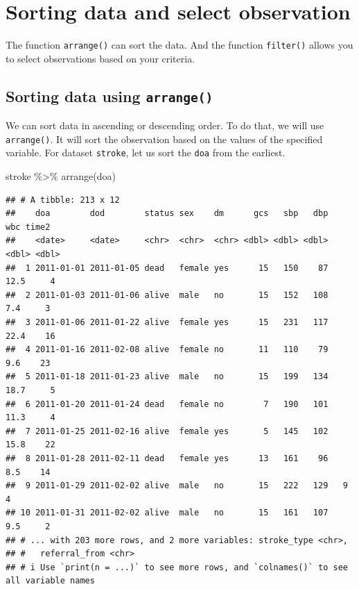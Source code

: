 \documentclass[
  10pt,
]{krantz}
\newenvironment{Shaded}{\begin{snugshade}}{\end{snugshade}}
\newcommand{\FunctionTok}[1]{\textcolor[rgb]{0.00,0.00,0.00}{#1}}
\newcommand{\NormalTok}[1]{#1}
\newcommand{\SpecialCharTok}[1]{\textcolor[rgb]{0.00,0.00,0.00}{#1}}
\begin{document}
\hypertarget{sorting-data-and-select-observation}{%
\section{Sorting data and select observation}\label{sorting-data-and-select-observation}}

The function \texttt{arrange()} can sort the data. And the function \texttt{filter()} allows you to select observations based on your criteria.

\hypertarget{sorting-data-using-arrange}{%
\subsection{\texorpdfstring{Sorting data using \texttt{arrange()}}{Sorting data using arrange()}}\label{sorting-data-using-arrange}}

We can sort data in ascending or descending order. To do that, we will use \texttt{arrange()}. It will sort the observation based on the values of the specified variable. For dataset \texttt{stroke}, let us sort the \texttt{doa} from the earliest.

\begin{Shaded}
\begin{Highlighting}[]
\NormalTok{stroke }\SpecialCharTok{\%\textgreater{}\%} \FunctionTok{arrange}\NormalTok{(doa)}
\end{Highlighting}
\end{Shaded}

\begin{verbatim}
## # A tibble: 213 x 12
##    doa        dod        status sex    dm      gcs   sbp   dbp   wbc time2
##    <date>     <date>     <chr>  <chr>  <chr> <dbl> <dbl> <dbl> <dbl> <dbl>
##  1 2011-01-01 2011-01-05 dead   female yes      15   150    87  12.5     4
##  2 2011-01-03 2011-01-06 alive  male   no       15   152   108   7.4     3
##  3 2011-01-06 2011-01-22 alive  female yes      15   231   117  22.4    16
##  4 2011-01-16 2011-02-08 alive  female no       11   110    79   9.6    23
##  5 2011-01-18 2011-01-23 alive  male   no       15   199   134  18.7     5
##  6 2011-01-20 2011-01-24 dead   female no        7   190   101  11.3     4
##  7 2011-01-25 2011-02-16 alive  female yes       5   145   102  15.8    22
##  8 2011-01-28 2011-02-11 dead   female yes      13   161    96   8.5    14
##  9 2011-01-29 2011-02-02 alive  male   no       15   222   129   9       4
## 10 2011-01-31 2011-02-02 alive  male   no       15   161   107   9.5     2
## # ... with 203 more rows, and 2 more variables: stroke_type <chr>,
## #   referral_from <chr>
## # i Use `print(n = ...)` to see more rows, and `colnames()` to see all variable names
\end{verbatim}
\end{document}

